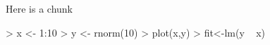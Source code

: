 \documentclass{article}
\begin{document}


Here is a chunk

\begin{Schunk}
\begin{Sinput}
> x <- 1:10
> y <- rnorm(10)
> plot(x,y)
> fit<-lm(y ~ x)
\end{Sinput}
\end{Schunk}
\end{document}
